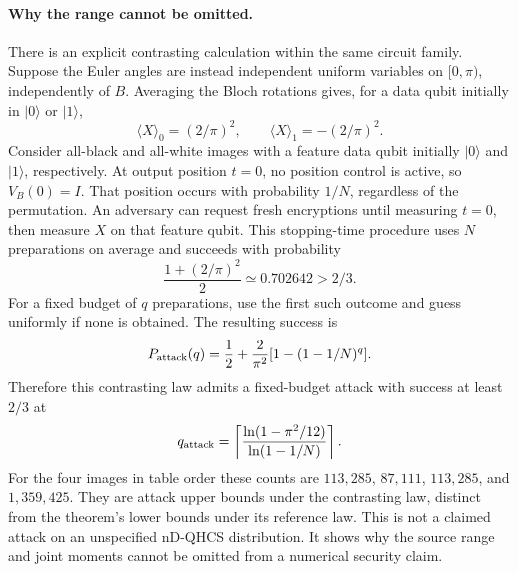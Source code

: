 \documentclass[11pt,a4paper]{article}
\begin{document}
{\paragraph{Why the range cannot be omitted.}
There is an explicit contrasting calculation within the same circuit
family. Suppose the Euler angles are instead independent uniform
variables on $[0,\pi)$, independently of $B$. Averaging the Bloch
rotations gives, for a data qubit initially in $|0\rangle$ or
$|1\rangle$,
\begin{equation}
 \langle X\rangle_0=(2/\pi)^2,\qquad
 \langle X\rangle_1=-(2/\pi)^2.
\end{equation}
Consider all-black and all-white images with a feature data qubit
initially $|0\rangle$ and $|1\rangle$, respectively. At output position
$t=0$, no position control is active, so $V_B(0)=I$. That position
occurs with probability $1/N$, regardless of the permutation.
An adversary can request fresh encryptions until measuring $t=0$,
then measure $X$ on that feature qubit. This stopping-time procedure
uses $N$ preparations on average and succeeds with probability
\begin{equation}
 \frac{1+(2/\pi)^2}{2}\simeq0.702642>2/3.
\end{equation}
For a fixed budget of $q$ preparations, use the first such outcome
and guess uniformly if none is obtained. The resulting success is
\begin{equation}
 P_{\rm attack}(q)=\frac12+\frac{2}{\pi^2}
      [1-(1-1/N)^q].
\end{equation}
Therefore this contrasting law admits a fixed-budget attack with
success at least $2/3$ at
\begin{equation}
 q_{\rm attack}=\left\lceil
 \frac{\ln(1-\pi^2/12)}{\ln(1-1/N)}\right\rceil.
\end{equation}
For the four images in table order these counts are $113,285$,
$87,111$, $113,285$, and $1,359,425$. They are attack upper bounds
under the contrasting law, distinct from the theorem's lower bounds
under its reference law. This is not a claimed attack on an
unspecified nD-QHCS distribution. It shows why the source range and
joint moments cannot be omitted from a numerical security claim.

{\color{red}
}}
\end{document}
